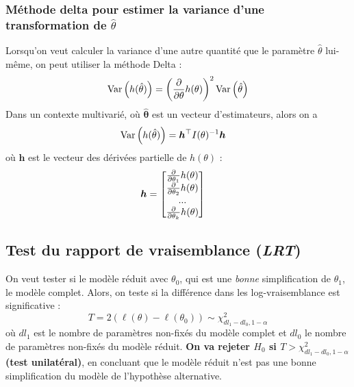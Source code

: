 \documentclass[french, landscape]{article}
\begin{document}
\begin{multicols*}{3}
\subsubsection*{Méthode delta pour estimer la variance d'une transformation de $\hat{\theta}$}
Lorsqu'on veut calculer la variance d'une autre quantité que le paramètre $\hat{\theta}$ lui-même, on peut utiliser la méthode Delta : 
\[\mathrm{Var} \left( h(\hat{\theta}) \right)  = \left( \frac{\partial}{\partial \theta} h(\theta) \right)^2 \mathrm{Var} \left( \hat{\theta} \right)\]
Dans un contexte multivarié, où $\bm{\hat{\theta}}$ est un vecteur d'estimateurs, alors on a
\begin{align*}
\mathrm{Var} \left( h(\hat{\theta}) \right)	& = \bm{h}^{\top} I(\theta)^{-1} \bm{h}
\end{align*}
où $\bm{h}$ est le vecteur des dérivées partielle de $h(\theta)$ : 
\begin{align*}
\bm{h}	& = 
\begin{bmatrix}
\frac{\partial}{\partial \theta_1} h(\theta) \\
\frac{\partial}{\partial \theta_2} h(\theta) \\
... \\
\frac{\partial}{\partial \theta_k} h(\theta) \\
\end{bmatrix}
\end{align*}

\subsection*{Test du rapport de vraisemblance (\emph{LRT})}
On veut tester si le modèle réduit avec $\theta_0$, qui est une \emph{bonne} simplification de $\theta_1$, le modèle complet. Alors, on teste si la différence dans les log-vraisemblance est significative : 
\[T = 2 \left( \ell(\theta) - \ell(\theta_0) \right) \sim  \chi_{dl_1 - dl_0, 1-\alpha}^2\]
où $dl_1$ est le nombre de paramètres non-fixés du modèle complet et $dl_0$ le nombre de paramètres non-fixés du modèle réduit. \textbf{On va rejeter $H_0$ si $T >\chi_{dl_1 - dl_0, 1-\alpha}^2 $ (test unilatéral)}, en concluant que le modèle réduit n'est pas une bonne simplification du modèle de l'hypothèse alternative.


\end{multicols*}
\end{document}
